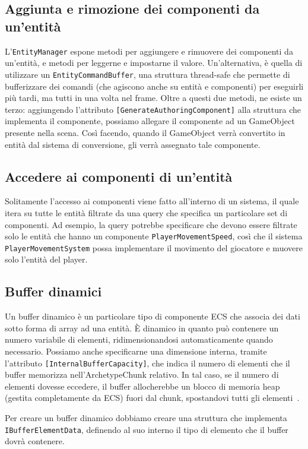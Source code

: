 \subsection{Aggiunta e rimozione dei componenti da un'entità}
L'\verb|EntityManager| espone metodi per aggiungere e rimuovere dei componenti da un'entità, e metodi per leggerne e impostarne il valore. Un'alternativa, è quella di utilizzare un \verb|EntityCommandBuffer|, una struttura thread-safe che permette di bufferizzare dei comandi (che agiscono anche su entità e componenti) per eseguirli più tardi, ma tutti in una volta nel frame.
Oltre a questi due metodi, ne esiste un terzo: aggiungendo l'attributo \verb|[GenerateAuthoringComponent]| alla struttura che implementa il componente, possiamo allegare il componente ad un GameObject presente nella scena. Così facendo, quando il GameObject verrà convertito in entità dal sistema di conversione, gli verrà assegnato tale componente.

\subsection{Accedere ai componenti di un'entità}
Solitamente l'accesso ai componenti viene fatto all'interno di un sistema, il quale itera su tutte le entità filtrate da una query che specifica un particolare set di componenti. Ad esempio, la query potrebbe specificare che devono essere filtrate solo le entità che hanno un componente \verb|PlayerMovementSpeed|, così che il sistema \verb|PlayerMovementSystem| possa implementare il movimento del giocatore e muovere solo l'entità del player.

\subsection{Buffer dinamici}
Un buffer dinamico è un particolare tipo di componente ECS che associa dei dati sotto forma di array ad una entità. È dinamico in quanto può contenere un numero variabile di elementi, ridimensionandosi automaticamente quando necessario. Possiamo anche specificarne una dimensione interna, tramite l'attributo \verb|[InternalBufferCapacity]|, che indica il numero di elementi che il buffer memorizza nell'ArchetypeChunk relativo. In tal caso, se il numero di elementi dovesse eccedere, il buffer allocherebbe un blocco di memoria heap (gestita completamente da ECS) fuori dal chunk, spostandovi tutti gli elementi~\cite{doc:unity-entities-manual}.

Per creare un buffer dinamico dobbiamo creare una struttura che implementa \verb|IBufferElementData|, definendo al suo interno il tipo di elemento che il buffer dovrà contenere.

